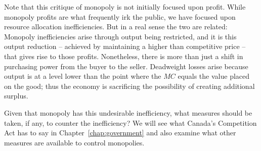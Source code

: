 Note that this critique of monopoly is not initially focused upon profit.
While monopoly profits are what frequently irk the public, we have focused
upon resource allocation inefficiencies. But in a real sense the two are
related: Monopoly inefficiencies arise through output being restricted, and
it is this output reduction -- achieved by maintaining a higher than
competitive price -- that gives rise to those profits. Nonetheless, there is
more than just a shift in purchasing power from the buyer to the seller.
Deadweight losses arise because output is at a level lower than the point
where the $MC$ equals the value placed on the good; thus the economy is
sacrificing the possibility of creating additional surplus.

Given that monopoly has this undesirable inefficiency, what measures should
be taken, if any, to counter the inefficiency? We will see what Canada's
Competition Act has to say in Chapter~\ref{chap:government} and also examine
what other measures are available to control monopolies.